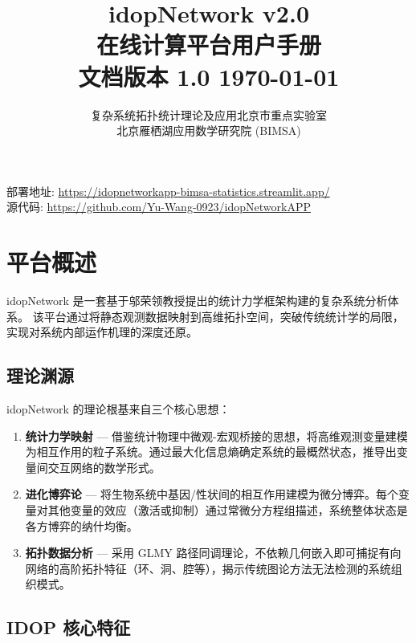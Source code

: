 \documentclass[12pt,a4paper]{ctexart}
\title{
    \vspace{-1cm}
    {\Huge\bfseries idopNetwork v2.0}\\[0.4cm]
    {\Large 在线计算平台用户手册}\\[0.2cm]
    {\normalsize\color{gray} 文档版本 1.0 \quad\today}
}
\author{
    \vspace{0.3cm}
    复杂系统拓扑统计理论及应用北京市重点实验室\\
    北京雁栖湖应用数学研究院 (BIMSA)
}
\begin{document}
\maketitle
\thispagestyle{empty}

\vspace{0.8cm}
\begin{center}
    \small\color{gray}
    部署地址: \url{https://idopnetworkapp-bimsa-statistics.streamlit.app/}\\
    源代码: \url{https://github.com/Yu-Wang-0923/idopNetworkAPP}
\end{center}

\newpage
\tableofcontents
\newpage

\section{平台概述}

idopNetwork 是一套基于邬荣领教授提出的统计力学框架构建的复杂系统分析体系。
该平台通过将静态观测数据映射到高维拓扑空间，突破传统统计学的局限，实现对系统内部运作机理的深度还原。

\subsection{理论渊源}

idopNetwork 的理论根基来自三个核心思想：

\begin{enumerate}[leftmargin=*]
    \item \textbf{统计力学映射} --- 借鉴统计物理中微观-宏观桥接的思想，将高维观测变量建模为相互作用的粒子系统。通过最大化信息熵确定系统的最概然状态，推导出变量间交互网络的数学形式。
    \item \textbf{进化博弈论} --- 将生物系统中基因/性状间的相互作用建模为微分博弈。每个变量对其他变量的效应（激活或抑制）通过常微分方程组描述，系统整体状态是各方博弈的纳什均衡。
    \item \textbf{拓扑数据分析} --- 采用 GLMY 路径同调理论，不依赖几何嵌入即可捕捉有向网络的高阶拓扑特征（环、洞、腔等），揭示传统图论方法无法检测的系统组织模式。
\end{enumerate}

\subsection{IDOP 核心特征}
\end{document}
